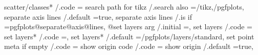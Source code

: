 {{{{{{{{{{{{{{{{{{{{{{{{{{{{{{{{{{{{{{{{{{{{scatter/classes*                             /.code                                                                                    ={%
search path for tikz                         /.search also                                                                             ={/tikz,/pgfplots},                                                                                                 
separate axis lines                          /.default                                                                                 =true,                                                                                                              
separate axis lines                          /.is if                                                                                   =pgfplots@separate@axis@lines,                                                                                      
@set layers arg                              /.initial                                                                                 =,                                                                                                                  
set layers                                   /.code                                                                                    ={%
set layers*                                  /.code                                                                                    =,                                                                                      
set layers*                                  /.default                                                                                 ={/pgfplots/layers/standard},                                                                                       
set point meta if empty                      /.code                                                                                    ={%
show origin code                             /.code                                                                                    ={%
show origin                                  /.default                                                                                 =true,                                                                                                              
}}}}}}}}}}}}}}}}}}}}}}}}}}}}}}}}}}}}}}}}}}}}}}}}

